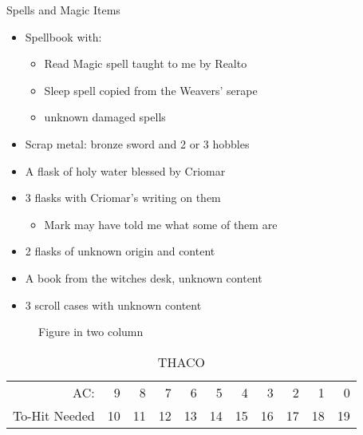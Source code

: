 \documentclass[a4paper]{article}
\begin{document}
\begin{multicols}{2}
Spells and Magic Items
\begin{itemize}[nosep, itemindent=1em, label=-]
  \item Spellbook with:
  \begin{itemize}[nosep, itemindent=1em, label=-]
    \item Read Magic spell taught to me by Realto
    \item Sleep spell copied from the Weavers' serape
    \item unknown damaged spells
  \end{itemize}
\item Scrap metal: bronze sword and 2 or 3 hobbles
\item A flask of holy water blessed by Criomar
\item 3 flasks with Criomar's writing on them
  \begin{itemize}[nosep, itemindent=1em, label=-]
    \item Mark may have told me what some of them are
  \end{itemize}
\item 2 flasks of unknown origin and content
\item A book from the witches desk, unknown content
\item 3 scroll cases with unknown content
\end{itemize}

\begin{figure}[H]
  \centering
  \caption{Figure in two column}
\end{figure}
\end{multicols}
\begin{table}[H]
  \begin{center}
    \caption*{THACO}
    \begin{tabular}{r|r|r|r|r|r|r|r|r|r|r} %
      AC: & 9 & 8 & 7 & 6 & 5 & 4 & 3 & 2 & 1 & 0\\
      To-Hit Needed & 10 & 11 & 12 & 13 & 14 & 15 & 16 & 17 & 18 & 19\\
    \end{tabular}
  \end{center}
\end{table}
\end{document}
